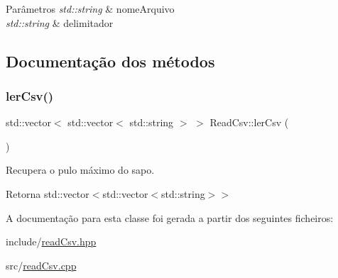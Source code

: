 \begin{DoxyParams}{Parâmetros}
{\em std\+::string} & nome\+Arquivo \\
\hline
{\em std\+::string} & delimitador \\
\hline
\end{DoxyParams}


\subsection{Documentação dos métodos}
\mbox{\label{classReadCsv_a15d5143be99ff85bcf997617d0650f1c}} 
\subsubsection{\texorpdfstring{ler\+Csv()}{lerCsv()}}
{\footnotesize\ttfamily std\+::vector$<$ std\+::vector$<$ std\+::string $>$ $>$ Read\+Csv\+::ler\+Csv (\begin{DoxyParamCaption}{ }\end{DoxyParamCaption})}



Recupera o pulo máximo do sapo. 

\begin{DoxyReturn}{Retorna}
std\+::vector$<$std\+::vector$<$std\+::string$>$$>$ 
\end{DoxyReturn}


A documentação para esta classe foi gerada a partir dos seguintes ficheiros\+:\begin{DoxyCompactItemize}
\item 
include/\hyperlink{readCsv_8hpp}{read\+Csv.\+hpp}\item 
src/\hyperlink{readCsv_8cpp}{read\+Csv.\+cpp}\end{DoxyCompactItemize}
